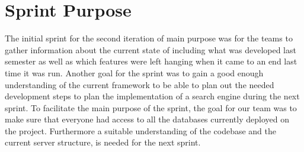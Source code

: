 \section{Sprint Purpose}
The initial sprint for the second iteration of \knox{} main purpose was for the teams to gather information 
about the current state of \knox{} including what was developed last semester as well as which features were 
left hanging when it came to an end last time it was run. Another goal for the sprint was to gain a 
good enough understanding of the current framework to be able to plan out the needed development steps to 
plan the implementation of a search engine during the next sprint. 
To facilitate the main purpose of the sprint, the goal for our team was to make sure that everyone had access to all the databases currently deployed on the \knox{} project. Furthermore a suitable understanding 
of the codebase and the current server structure, is needed for the next sprint.
